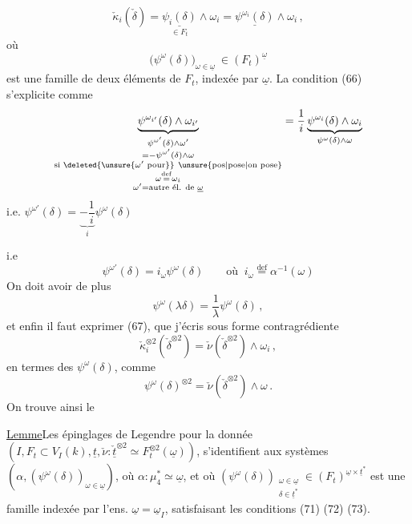 \[
\check\kappa_i(\check\delta)=\underset{\in F_t}{\underline{\psi_i(\delta)}}\mathbin{\wedge}\omega_i
=\underline{\psi^{\omega_i}(\delta)}\mathbin{\wedge}\omega_i\,, \tag*{-(69)}
\]
où
\[
\bigl(\psi^\omega(\delta)\bigr)_{\omega\in\underline\omega}\ \in (F_t)^{\underline\omega} \tag*{(70)}
\]
est une famille de  deux éléments de $F_t$, indexée par $\underline\omega$. La condition  (66) s'explicite comme
\[
\underbrace{\psi^{\omega_{i'}}(\delta)\mathbin{\wedge}\omega_{i'}}_{
\substack{\psi^{\omega'}(\delta)\mathbin{\wedge}\omega'\\
=-\psi^{\omega'}(\delta)\mathbin{\wedge}\omega\\
\text{si }\deleted{\unsure{\omega'\text{ pour}}}\ \text{\unsure{pos|pose|on pose}}\\
\omega\overset{\mathrm{def}}{=}\omega_i\\
\omega'=\text{autre él. de }\underline\omega}}
=\frac1i\underbrace{\psi^{\omega_i}(\delta)\mathbin{\wedge}\omega_i}_{\psi^\omega(\delta)\mathbin{\wedge}\omega}
\]
i.e. $\psi^{\omega'}(\delta)=\underbrace{-\dfrac1i}_{i}\psi^\omega(\delta)$

i.e
\[
\psi^{\omega'}(\delta)=i_\omega\psi^\omega(\delta)
\qquad\text{où }\ i_\omega\overset{\mathrm{def}}{=}\alpha^{-1}(\omega) \tag*{(71)}
\]
On doit avoir de plus
\[
\psi^\omega(\lambda\delta)=\frac1\lambda\psi^\omega(\delta)\,, \tag*{(72)}
\]
 et enfin il faut exprimer (67),
que j'écris sous forme contragrédiente
\[
\check\kappa_i^{\otimes2}(\check\delta^{\otimes2})=
\check\nu(\check\delta^{\otimes2})\mathbin{\wedge}\omega_i\,,
\]
en termes des $\psi^\omega(\delta)$, comme
\[
\psi^\omega(\delta)^{\otimes2}=\check\nu(\check\delta^{\otimes2})\mathbin{\wedge}\omega\,. \tag*{(73)}
\]
On trouve ainsi le

\uline{Lemme}\quad Les épinglages de Legendre pour la donnée $(I,F_t\subset V_I(k),\underline t,\check\nu:\underline{\check t}^{\otimes2}\simeq F_t^{\otimes2}(\underline\omega))$, s'identifient aux systèmes $(\alpha,(\psi^\omega(\delta))_{\omega\in\underline\omega})$, où $\alpha:\mu_4^*\simeq\underline\omega$, et où $(\psi^\omega(\delta))_{\substack{\omega\in\underline\omega\\\delta\in\underline t^*}}\in(F_t)^{\underline\omega\times\underline t^*}$  est une famille indexée par l'ens.    $\underline\omega=\underline\omega_I$, satisfaisant les conditions (71) (72) (73).


